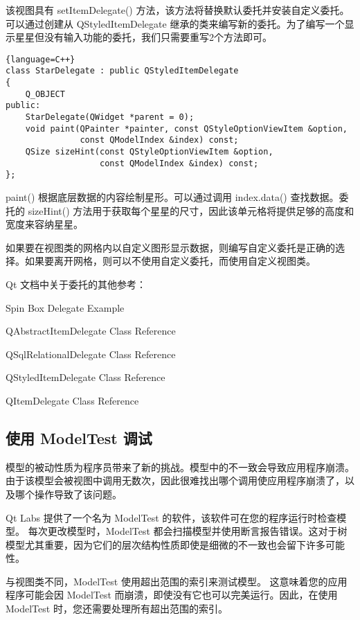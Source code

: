该视图具有 setItemDelegate() 方法，该方法将替换默认委托并安装自定义委托。
可以通过创建从 QStyledItemDelegate 继承的类来编写新的委托。为了编写一个显示星星但没有输入功能的委托，我们只需要重写2个方法即可。


\begin{lstlisting}{language=C++}
class StarDelegate : public QStyledItemDelegate
{
    Q_OBJECT
public:
    StarDelegate(QWidget *parent = 0);
    void paint(QPainter *painter, const QStyleOptionViewItem &option,
               const QModelIndex &index) const;
    QSize sizeHint(const QStyleOptionViewItem &option,
                   const QModelIndex &index) const;
};
\end{lstlisting}

paint() 根据底层数据的内容绘制星形。可以通过调用 index.data() 查找数据。委托的 sizeHint() 方法用于获取每个星星的尺寸，因此该单元格将提供足够的高度和宽度来容纳星星。

如果要在视图类的网格内以自定义图形显示数据，则编写自定义委托是正确的选择。如果要离开网格，则可以不使用自定义委托，而使用自定义视图类。

Qt 文档中关于委托的其他参考：

\begin{compactitem}
\item Spin Box Delegate Example
\item QAbstractItemDelegate Class Reference
\item QSqlRelationalDelegate Class Reference
\item QStyledItemDelegate Class Reference
\item QItemDelegate Class Reference
\end{compactitem}

\subsection{使用 ModelTest 调试}

模型的被动性质为程序员带来了新的挑战。模型中的不一致会导致应用程序崩溃。
由于该模型会被视图中调用无数次，因此很难找出哪个调用使应用程序崩溃了，以及哪个操作导致了该问题。

Qt Labs 提供了一个名为 ModelTest 的软件，该软件可在您的程序运行时检查模型。
每次更改模型时，ModelTest 都会扫描模型并使用断言报告错误。这对于树模型尤其重要，因为它们的层次结构性质即使是细微的不一致也会留下许多可能性。

与视图类不同，ModelTest 使用超出范围的索引来测试模型。
这意味着您的应用程序可能会因 ModelTest 而崩溃，即使没有它也可以完美运行。因此，在使用 ModelTest 时，您还需要处理所有超出范围的索引。